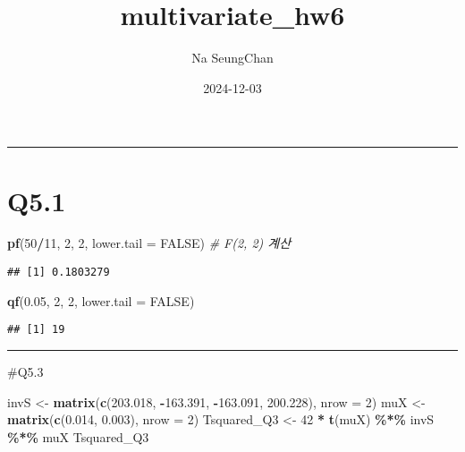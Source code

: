\documentclass[
]{article}
\title{multivariate\_hw6}
\author{Na SeungChan}
\date{2024-12-03}
\newenvironment{Shaded}{\begin{snugshade}}{\end{snugshade}}
\newcommand{\AttributeTok}[1]{\textcolor[rgb]{0.13,0.29,0.53}{#1}}
\newcommand{\CommentTok}[1]{\textcolor[rgb]{0.56,0.35,0.01}{\textit{#1}}}
\newcommand{\ConstantTok}[1]{\textcolor[rgb]{0.56,0.35,0.01}{#1}}
\newcommand{\DecValTok}[1]{\textcolor[rgb]{0.00,0.00,0.81}{#1}}
\newcommand{\FloatTok}[1]{\textcolor[rgb]{0.00,0.00,0.81}{#1}}
\newcommand{\FunctionTok}[1]{\textcolor[rgb]{0.13,0.29,0.53}{\textbf{#1}}}
\newcommand{\NormalTok}[1]{#1}
\newcommand{\OtherTok}[1]{\textcolor[rgb]{0.56,0.35,0.01}{#1}}
\newcommand{\SpecialCharTok}[1]{\textcolor[rgb]{0.81,0.36,0.00}{\textbf{#1}}}
\begin{document}
\maketitle

\begin{center}\rule{0.5\linewidth}{0.5pt}\end{center}

\section{Q5.1}\label{q5.1}

\begin{Shaded}
\begin{Highlighting}[]
\FunctionTok{pf}\NormalTok{(}\DecValTok{50}\SpecialCharTok{/}\DecValTok{11}\NormalTok{, }\DecValTok{2}\NormalTok{, }\DecValTok{2}\NormalTok{, }\AttributeTok{lower.tail =} \ConstantTok{FALSE}\NormalTok{) }\CommentTok{\# F(2, 2) 계산}
\end{Highlighting}
\end{Shaded}

\begin{verbatim}
## [1] 0.1803279
\end{verbatim}

\begin{Shaded}
\begin{Highlighting}[]
\FunctionTok{qf}\NormalTok{(}\FloatTok{0.05}\NormalTok{, }\DecValTok{2}\NormalTok{, }\DecValTok{2}\NormalTok{, }\AttributeTok{lower.tail =} \ConstantTok{FALSE}\NormalTok{)}
\end{Highlighting}
\end{Shaded}

\begin{verbatim}
## [1] 19
\end{verbatim}

\begin{center}\rule{0.5\linewidth}{0.5pt}\end{center}

\#Q5.3

\begin{Shaded}
\begin{Highlighting}[]
\NormalTok{invS }\OtherTok{\textless{}{-}} \FunctionTok{matrix}\NormalTok{(}\FunctionTok{c}\NormalTok{(}\FloatTok{203.018}\NormalTok{, }\SpecialCharTok{{-}}\FloatTok{163.391}\NormalTok{, }\SpecialCharTok{{-}}\FloatTok{163.091}\NormalTok{, }\FloatTok{200.228}\NormalTok{), }\AttributeTok{nrow =} \DecValTok{2}\NormalTok{)}
\NormalTok{muX }\OtherTok{\textless{}{-}} \FunctionTok{matrix}\NormalTok{(}\FunctionTok{c}\NormalTok{(}\FloatTok{0.014}\NormalTok{, }\FloatTok{0.003}\NormalTok{), }\AttributeTok{nrow =} \DecValTok{2}\NormalTok{)}
\NormalTok{Tsquared\_Q3 }\OtherTok{\textless{}{-}} \DecValTok{42} \SpecialCharTok{*} \FunctionTok{t}\NormalTok{(muX) }\SpecialCharTok{\%*\%}\NormalTok{ invS }\SpecialCharTok{\%*\%}\NormalTok{ muX}
\NormalTok{Tsquared\_Q3}
\end{Highlighting}
\end{Shaded}
\end{document}

